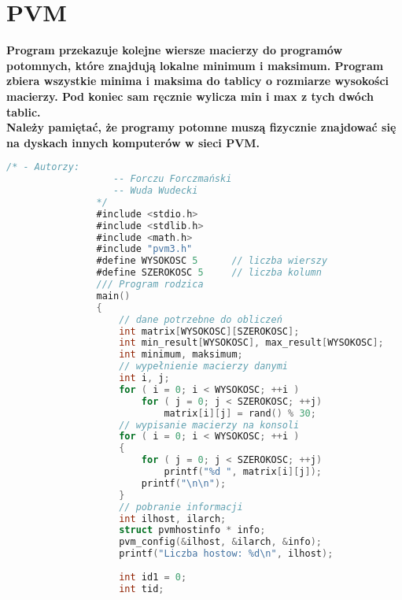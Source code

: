 \section{PVM}
			\textbf{Program przekazuje kolejne wiersze macierzy do programów potomnych, które znajdują lokalne minimum i maksimum. Program zbiera wszystkie minima i maksima do tablicy o rozmiarze wysokości macierzy. Pod koniec sam ręcznie wylicza min i max z tych dwóch tablic.\\
			Należy pamiętać, że programy potomne muszą fizycznie znajdować się na dyskach innych komputerów w sieci PVM.\\}
			\begin{lstlisting}[language={C}]
				/* - Autorzy:
				   -- Forczu Forczmański
				   -- Wuda Wudecki
				*/
				#include <stdio.h>
				#include <stdlib.h>
				#include <math.h>
				#include "pvm3.h"
				#define WYSOKOSC 5		// liczba wierszy
				#define SZEROKOSC 5		// liczba kolumn
				/// Program rodzica
				main()
				{
					// dane potrzebne do obliczeń
					int matrix[WYSOKOSC][SZEROKOSC];
					int min_result[WYSOKOSC], max_result[WYSOKOSC];
					int minimum, maksimum;
					// wypełnienie macierzy danymi
					int i, j;
					for ( i = 0; i < WYSOKOSC; ++i )
						for ( j = 0; j < SZEROKOSC; ++j)
							matrix[i][j] = rand() % 30;
					// wypisanie macierzy na konsoli
					for ( i = 0; i < WYSOKOSC; ++i )
					{
						for ( j = 0; j < SZEROKOSC; ++j)
							printf("%d ", matrix[i][j]);
						printf("\n\n");
					}
					// pobranie informacji
					int ilhost, ilarch;
					struct pvmhostinfo * info;
					pvm_config(&ilhost, &ilarch, &info);
					printf("Liczba hostow: %d\n", ilhost);
					
					int id1 = 0;
					int tid;
					
					
					

\end{lstlisting}
